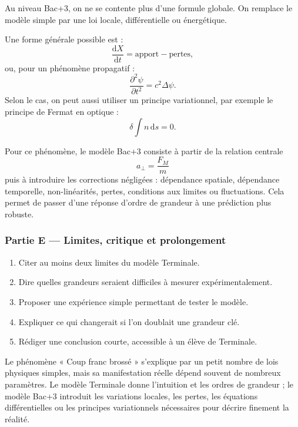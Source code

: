 \documentclass[11pt,a4paper]{article}
\begin{document}
\begin{approfondissementbox}
Au niveau Bac+3, on ne se contente plus d'une formule globale. On remplace le modèle simple par une loi locale, différentielle ou énergétique.

Une forme générale possible est :
\[
\frac{\mathrm d X}{\mathrm dt}=\text{apport}-\text{pertes},
\]
ou, pour un phénomène propagatif :
\[
\frac{\partial^2 \psi}{\partial t^2}=c^2\Delta\psi.
\]
Selon le cas, on peut aussi utiliser un principe variationnel, par exemple le principe de Fermat en optique :
\[
\delta \int n\,\mathrm ds=0.
\]

Pour ce phénomène, le modèle Bac+3 consiste à partir de la relation centrale
\[
a_\perp=\frac{F_M}{m}
\]
puis à introduire les corrections négligées : dépendance spatiale, dépendance temporelle, non-linéarités, pertes, conditions aux limites ou fluctuations. Cela permet de passer d'une réponse d'ordre de grandeur à une prédiction plus robuste.
\end{approfondissementbox}

\subsubsection*{Partie E — Limites, critique et prolongement}

\begin{enumerate}
  \item Citer au moins deux limites du modèle Terminale.
  \item Dire quelles grandeurs seraient difficiles à mesurer expérimentalement.
  \item Proposer une expérience simple permettant de tester le modèle.
  \item Expliquer ce qui changerait si l'on doublait une grandeur clé.
  \item Rédiger une conclusion courte, accessible à un élève de Terminale.
\end{enumerate}

\begin{corrigebox}
Le phénomène « Coup franc brossé » s'explique par un petit nombre de lois physiques simples, mais sa manifestation réelle dépend souvent de nombreux paramètres. Le modèle Terminale donne l'intuition et les ordres de grandeur ; le modèle Bac+3 introduit les variations locales, les pertes, les équations différentielles ou les principes variationnels nécessaires pour décrire finement la réalité.
\end{corrigebox}
\end{document}
